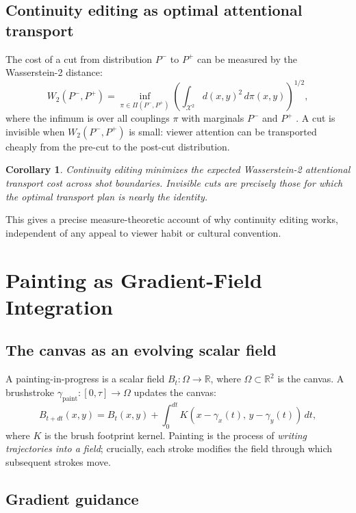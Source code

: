 \documentclass[12pt,a4paper]{article}
\theoremstyle{plain}
\newtheorem{corollary}[theorem]{Corollary}
\theoremstyle{definition}
\begin{document}
\subsection{Continuity editing as optimal attentional transport}

The cost of a cut from distribution $P^-$ to $P^+$ can be measured by the
Wasserstein-2 distance:
\[
W_2(P^-,P^+)
= \inf_{\pi\in\Pi(P^-,P^+)}
\!\left(\int_{\mathcal{X}^2} d(x,y)^2\,d\pi(x,y)\right)^{\!1/2},
\]
where the infimum is over all couplings $\pi$ with marginals $P^-$ and $P^+$
\cite{villani2009}. A cut is invisible when $W_2(P^-,P^+)$ is small: viewer
attention can be transported cheaply from the pre-cut to the post-cut
distribution.

\begin{corollary}
Continuity editing minimizes the expected Wasserstein-2 attentional transport
cost across shot boundaries. Invisible cuts are precisely those for which the
optimal transport plan is nearly the identity.
\end{corollary}

This gives a precise measure-theoretic account of why continuity editing
works, independent of any appeal to viewer habit or cultural convention.

\section{Painting as Gradient-Field Integration}
\label{sec:painting}

\subsection{The canvas as an evolving scalar field}

A painting-in-progress is a scalar field $B_t:\Omega\to\mathbb{R}$, where
$\Omega\subset\mathbb{R}^2$ is the canvas. A brushstroke
$\gamma_{\text{paint}}:[0,\tau]\to\Omega$ updates the canvas:
\[
B_{t+dt}(x,y)
= B_t(x,y)
+ \int_0^{dt} K(x-\gamma_x(t),\,y-\gamma_y(t))\,dt,
\]
where $K$ is the brush footprint kernel. Painting is the process of
\emph{writing trajectories into a field}; crucially, each stroke modifies the
field through which subsequent strokes move.

\subsection{Gradient guidance}
\end{document}
